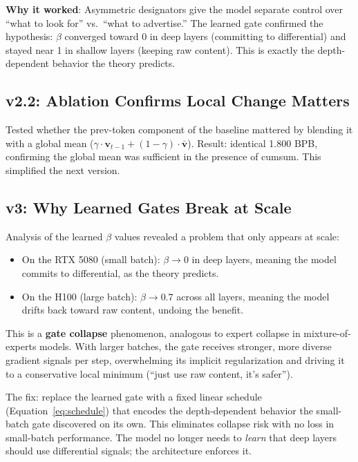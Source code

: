 \documentclass[11pt]{article}
\begin{document}
\textbf{Why it worked}: Asymmetric designators give the model separate control over ``what to look for'' vs.\ ``what to advertise.'' The learned gate confirmed the hypothesis: $\beta$ converged toward 0 in deep layers (committing to differential) and stayed near 1 in shallow layers (keeping raw content). This is exactly the depth-dependent behavior the theory predicts.

\subsection{v2.2: Ablation Confirms Local Change Matters}
Tested whether the prev-token component of the baseline mattered by blending it with a global mean ($\gamma \cdot \mathbf{v}_{t-1} + (1-\gamma) \cdot \bar{\mathbf{v}}$). Result: identical 1.800 BPB, confirming the global mean was sufficient in the presence of cumsum. This simplified the next version.

\subsection{v3: Why Learned Gates Break at Scale}
\label{sec:v3}
Analysis of the learned $\beta$ values revealed a problem that only appears at scale:
\begin{itemize}
    \item On the RTX 5080 (small batch): $\beta \to 0$ in deep layers, meaning the model commits to differential, as the theory predicts.
    \item On the H100 (large batch): $\beta \to 0.7$ across all layers, meaning the model drifts back toward raw content, undoing the benefit.
\end{itemize}
This is a \textbf{gate collapse} phenomenon, analogous to expert collapse in mixture-of-experts models. With larger batches, the gate receives stronger, more diverse gradient signals per step, overwhelming its implicit regularization and driving it to a conservative local minimum (``just use raw content, it's safer'').

The fix: replace the learned gate with a fixed linear schedule (Equation~\ref{eq:schedule}) that encodes the depth-dependent behavior the small-batch gate discovered on its own. This eliminates collapse risk with no loss in small-batch performance. The model no longer needs to \emph{learn} that deep layers should use differential signals; the architecture enforces it.
\end{document}
